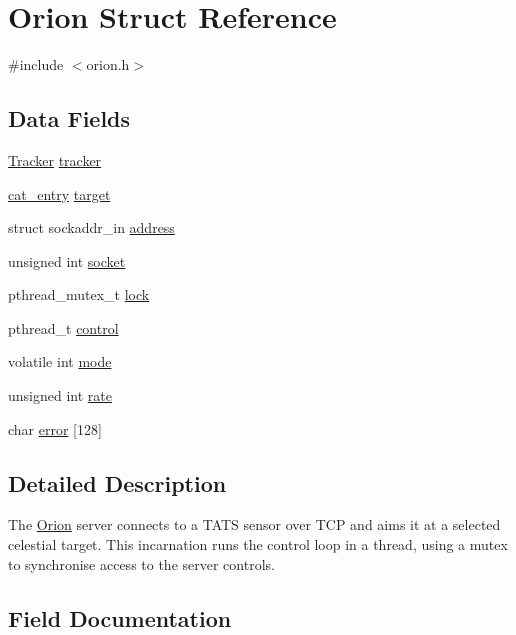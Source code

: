 \hypertarget{struct_orion}{}\section{Orion Struct Reference}
\label{struct_orion}


{\ttfamily \#include $<$orion.\+h$>$}

\subsection*{Data Fields}
\begin{DoxyCompactItemize}
\item 
\mbox{\hyperlink{struct_tracker}{Tracker}} \mbox{\hyperlink{struct_orion_a495e6bf1af7804551f312afd3bd7032a}{tracker}}
\item 
\mbox{\hyperlink{novas_8h_a262daaa71cede05205cfaa727313c1f3}{cat\+\_\+entry}} \mbox{\hyperlink{struct_orion_a4aa5babb303788c009f95322895c2e6c}{target}}
\item 
struct sockaddr\+\_\+in \mbox{\hyperlink{struct_orion_a367491879e8ce396250c54956bc6ed5e}{address}}
\item 
unsigned int \mbox{\hyperlink{struct_orion_a13301f1712f628ef6520dfe1f4e4b70d}{socket}}
\item 
pthread\+\_\+mutex\+\_\+t \mbox{\hyperlink{struct_orion_a0abaf4b5d42c4e5d19190035fade3599}{lock}}
\item 
pthread\+\_\+t \mbox{\hyperlink{struct_orion_a60e242a7925447f8aa006a5126e7d100}{control}}
\item 
volatile int \mbox{\hyperlink{struct_orion_afa9d6911164917fd0b12dbdf0df0ff3a}{mode}}
\item 
unsigned int \mbox{\hyperlink{struct_orion_adf42a979321286885fe5a447d48d14d6}{rate}}
\item 
char \mbox{\hyperlink{struct_orion_a2934b458b7d1f80c5034b207fcd05c31}{error}} \mbox{[}128\mbox{]}
\end{DoxyCompactItemize}


\subsection{Detailed Description}
The \mbox{\hyperlink{struct_orion}{Orion}} server connects to a T\+A\+TS sensor over T\+CP and aims it at a selected celestial target. This incarnation runs the control loop in a thread, using a mutex to synchronise access to the server controls. 

\subsection{Field Documentation}
\mbox{\label{struct_orion_a367491879e8ce396250c54956bc6ed5e}} 
